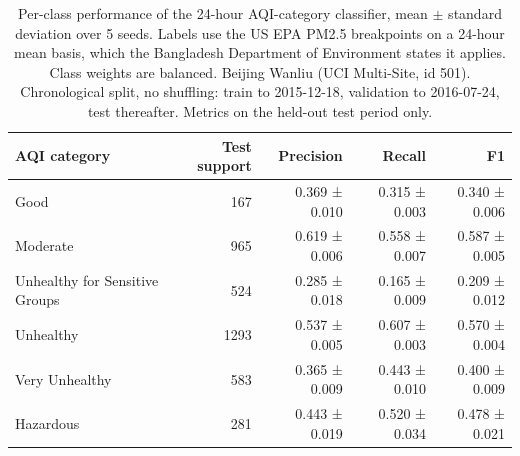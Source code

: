 \begin{table}[htbp]
\caption{Per-class performance of the 24-hour AQI-category classifier, mean $\pm$ standard deviation over 5 seeds. Labels use the US EPA PM2.5 breakpoints on a 24-hour mean basis, which the Bangladesh Department of Environment states it applies. Class weights are balanced. Beijing Wanliu (UCI Multi-Site, id 501). Chronological split, no shuffling: train to 2015-12-18, validation to 2016-07-24, test thereafter. Metrics on the held-out test period only.}
\label{tab:classification_per_class}
\begin{tabular}{lrrrr}
\toprule
AQI category & Test support & Precision & Recall & F1 \\
\midrule
Good & 167 & 0.369 ± 0.010 & 0.315 ± 0.003 & 0.340 ± 0.006 \\
Moderate & 965 & 0.619 ± 0.006 & 0.558 ± 0.007 & 0.587 ± 0.005 \\
Unhealthy for Sensitive Groups & 524 & 0.285 ± 0.018 & 0.165 ± 0.009 & 0.209 ± 0.012 \\
Unhealthy & 1293 & 0.537 ± 0.005 & 0.607 ± 0.003 & 0.570 ± 0.004 \\
Very Unhealthy & 583 & 0.365 ± 0.009 & 0.443 ± 0.010 & 0.400 ± 0.009 \\
Hazardous & 281 & 0.443 ± 0.019 & 0.520 ± 0.034 & 0.478 ± 0.021 \\
\bottomrule
\end{tabular}
\end{table}

